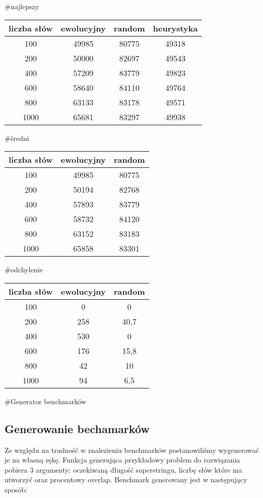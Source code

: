 
#najlepszy
\begin{tabular}{c|ccc}
  \hline
  liczba słów & ewolucyjny & random & heurystyka\\
  \hline
  100 & 49985 & 80775 & 49318 \\
  200 & 50000 & 82697 & 49543 \\
  400 & 57209 & 83779 & 49823\\
  600 & 58640 & 84110 & 49764 \\
  800 & 63133 & 83178 & 49571 \\
  1000 & 65681 & 83297 & 49938 
\end{tabular}

#średni
\begin{tabular}{c|cc}
  \hline
  liczba słów & ewolucyjny & random\\
  \hline
  100 & 49985 & 80775 \\
  200 & 50194 & 82768 \\
  400 & 57893 & 83779 \\
  600 & 58732 & 84120 \\
  800 & 63152 & 83183 \\
  1000 & 65858 & 83301
\end{tabular}

#odchylenie
\begin{tabular}{c|cc}
  \hline
  liczba słów & ewolucyjny & random\\
  \hline
  100 & 0 & 0 \\
  200 & 258 & 40,7 \\
  400 & 530 & 0 \\
  600 & 176 & 15,8 \\
  800 & 42 & 10 \\
  1000 & 94 & 6,5
\end{tabular}


#Generator benchmarków

\subsection{Generowanie bechamarków}
Ze względu na trudność w znalezieniu benchmarków postanowiliśmy wygenerować je
na własną rękę.  Funkcja generująca przykładowy problem do rozwiązania pobiera
3 argumenty: oczekiwaną długość superstringu, liczbę słów które ma utworzyć
oraz procentowy overlap. Benchmark generowany jest w następujący sposób:

